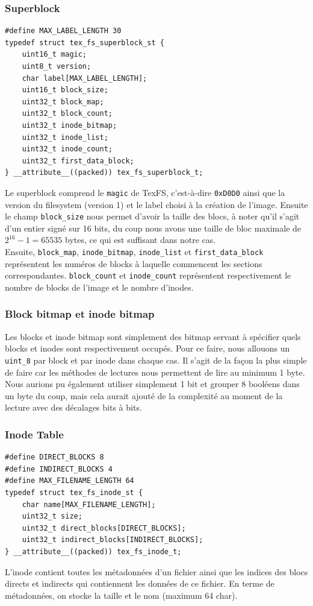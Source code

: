 \documentclass{article}
\begin{document}
\subsubsection{Superblock}
\begin{verbatim}
#define MAX_LABEL_LENGTH 30
typedef struct tex_fs_superblock_st {
    uint16_t magic;
    uint8_t version;
    char label[MAX_LABEL_LENGTH];
    uint16_t block_size;
    uint32_t block_map;
    uint32_t block_count;
    uint32_t inode_bitmap;
    uint32_t inode_list;
    uint32_t inode_count;
    uint32_t first_data_block;
} __attribute__((packed)) tex_fs_superblock_t;	
\end{verbatim}
Le superblock comprend le \verb+magic+ de TexFS, c'est-à-dire \verb+0xD0D0+ ainsi que la version du filesystem (version 1) et le label choisi à la création de l'image. Ensuite le champ \verb+block_size+ nous permet d'avoir la taille des blocs, à noter qu'il s'agit d'un entier signé sur 16 bits, du coup nous avons une taille de bloc maximale de $2^{16}-1=65535$ bytes, ce qui est suffisant dans notre cas. \\

Ensuite, \verb+block_map+, \verb+inode_bitmap+, \verb+inode_list+ et \verb+first_data_block+ représentent les numéros de blocks à laquelle commencent les sections correspondantes. \verb+block_count+ et \verb+inode_count+ représentent respectivement le nombre de blocks de l'image et le nombre d'inodes.
\subsubsection{Block bitmap et inode bitmap}
Les blocks et inode bitmap sont simplement des bitmap servant à spécifier quels blocks et inodes sont respectivement occupés. Pour ce faire, nous allouons un \verb+uint_8+ par block et par inode dans chaque cas. Il s'agit de la façon la plus simple de faire car les méthodes de lectures nous permettent de lire au minimum 1 byte. Nous aurions pu également utiliser simplement 1 bit et grouper 8 booléens dans un byte du coup, mais cela aurait ajouté de la complexité au moment de la lecture avec des décalages bits à bits.\\
\subsubsection{Inode Table}
\begin{verbatim}
#define DIRECT_BLOCKS 8
#define INDIRECT_BLOCKS 4
#define MAX_FILENAME_LENGTH 64
typedef struct tex_fs_inode_st {
    char name[MAX_FILENAME_LENGTH];
    uint32_t size;
    uint32_t direct_blocks[DIRECT_BLOCKS];
    uint32_t indirect_blocks[INDIRECT_BLOCKS];
} __attribute__((packed)) tex_fs_inode_t;
\end{verbatim}
L'inode contient toutes les métadonnées d'un fichier ainsi que les indices des blocs directs et indirects qui contiennent les données de ce fichier. En terme de métadonnées, on stocke la taille et le nom (maximum 64 char). \\
\end{document}

